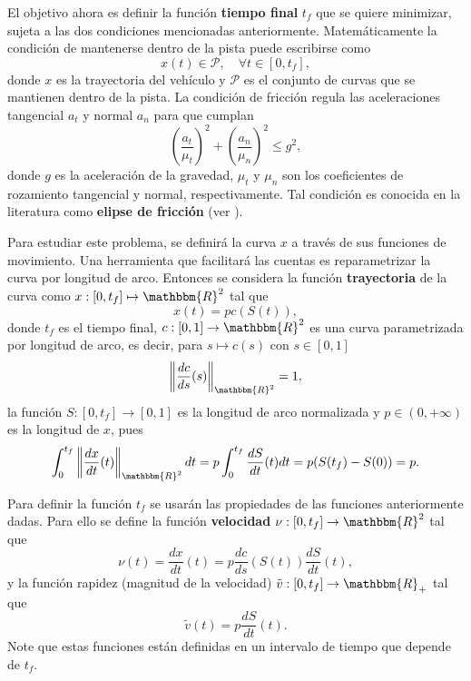 \documentclass[a4paper,10pt]{book}
\newcommand{\R}{\mathbbm{R}}
\newcommand{\arr}{\rightarrow}
\begin{document}
El objetivo ahora es definir la función \textbf{tiempo final} $t_f$ que se quiere minimizar, sujeta a las dos condiciones mencionadas anteriormente. Matem\'aticamente la condici\'on de mantenerse dentro de la pista puede escribirse como
\[
x(t)\in \mathcal{P}, \quad\forall t\in[0,t_f],
\]
donde $x$ es la trayectoria del vehículo y $\mathcal{P}$ es el conjunto de curvas que se mantienen dentro de la pista. La condici\'on de fricción regula las aceleraciones tangencial $a_t$ y normal $a_n$ para que cumplan
\begin{equation}\label{elipse}
 \left(\frac{a_t}{\mu_t}\right)^2+ \left(\frac{a_n}{\mu_n}\right)^2\leq g^2, 
\end{equation}
donde $g$ es la aceleración de la gravedad, $\mu_t$ y $\mu_n$ son los coeficientes de rozamiento tangencial y normal, respectivamente. Tal condici\'on es conocida en la literatura como \textbf{elipse de fricción} (ver \cite{rucco2012computing}).

Para estudiar este problema, se definirá la curva $x$ a través de sus funciones de movimiento. Una herramienta que facilitará las cuentas es reparametrizar la curva por longitud de arco.
Entonces se considera la función \textbf{trayectoria} de la curva como $x:[0,t_f]\mapsto \R^2$ tal que
\begin{equation}\label{trayectoria}
x(t) = p c(S(t)), 
\end{equation}
donde \(t_f\) es el tiempo final, $c:[0,1]\arr\R^2$ es una curva parametrizada por longitud de arco, es decir, para $s\mapsto c(s)$ con $s\in[0,1]$
\begin{equation}\label{pla}
\left \|\frac{dc}{ds}(s)\right\|_{\R^2}=1,    
\end{equation}
la funci\'on $S:[0,t_f]\arr [0,1]$ es la longitud de arco normalizada y $p\in(0,+\infty)$ es la longitud de $x$, pues
\[
 \int_0^{t_f} \left\|\frac{dx}{dt}(t)\right\|_{\R^2} dt = p \int_0^{t_f} \frac{dS}{dt}(t)dt=p(S(t_f)-S(0))=p.
\]


Para definir la funci\'on $t_f$ se usarán las propiedades de las funciones anteriormente dadas. Para ello se define la función \textbf{velocidad} $\nu:[0,t_f]\arr\R^2$ tal que
\begin{equation}
  \nu(t)=\frac{dx}{dt}(t)=p\frac{dc}{ds}(S(t))\frac{dS}{dt}(t), \label{velocidad}
\end{equation}
y la funci\'on rapidez (magnitud de la velocidad) $\tilde{v}:[0,t_f]\arr\R_+$ tal que
\[
 \tilde{v}(t)=p\frac{dS}{dt}(t).
\]
Note que estas funciones están definidas en un intervalo de tiempo que depende de $t_f$.
\end{document}
